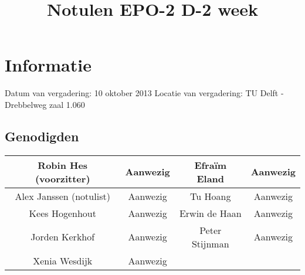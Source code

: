 \documentclass{article}
\begin{document}
\title{Notulen EPO-2 D-2 week }%
\author{}%
\maketitle

\section*{Informatie}
Datum van vergadering: 10 oktober 2013 %
Locatie van vergadering: TU Delft - Drebbelweg zaal 1.060 %
\subsection*{Genodigden}
\begin{center}
\begin{tabular}{|c |c | c| c|}
	\hline
Robin Hes (voorzitter) & Aanwezig & Efraïm Eland & Aanwezig \\
	\hline
Alex Janssen (notulist) & Aanwezig & Tu Hoang & Aanwezig \\
	\hline
Kees Hogenhout & Aanwezig & Erwin de Haan & Aanwezig\\
	\hline
Jorden Kerkhof & Aanwezig & Peter Stijnman & Aanwezig \\
	\hline
Xenia Wesdijk & Aanwezig & & \\
	\hline
\end{tabular}
\end{center}
\end{document}
